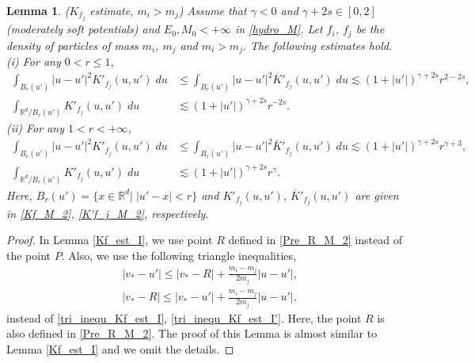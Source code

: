 \documentclass[reqno,10pt]{amsart}
\newtheorem{lemma}[theorem]{Lemma}
\numberwithin{equation}{section}
\begin{document}
\begin{lemma} ($K_{f_j}$ estimate, $m_i>m_j$) \label{Kf_j_estimate_M_2}
Assume that $\gamma<0$ and $\gamma+2s \in [0,2]$(moderately soft potentials) and $E_0,M_0<+\infty$ in \eqref{hydro_M}. Let $f_i$, $f_j$ be the density of particles of mass $m_i$, $m_j$ and $m_i>m_j.$ The following estimates hold.
\\
(i) For any $0<r \leq 1$,
\begin{align*} 
 \int_{B_{r}(u')}|u-u'|^2K'_{f_j}(u,u')\; du &\leq \int_{B_{r}(u')}|u-u'|^2\overline{K}'_{f_j}(u,u')\; du \lesssim (1+|u'|)^{\gamma+2s}r^{2-2s}, \\
 \int_{\mathbb{R}^d/B_{r}(u')}K'_{f_j}(u,u')\; du &\lesssim (1+|u'|)^{\gamma+2s}r^{-2s}.
\end{align*}
(ii) For any $1<r<+\infty$,
\begin{align*}  
    \int_{B_{r}(u')}|u-u'|^2K'_{f_j}(u,u')\; du &\leq \int_{B_{r}(u')}|u-u'|^2\overline{K}'_{f_j}(u,u')\; du \lesssim (1+|u'|)^{\gamma+2s}r^{\gamma+3},\\
    \int_{\mathbb{R}^d/B_{r}(u')}K'_{f_j}(u,u')\; du &\lesssim (1+|u'|)^{\gamma+2s}r^{\gamma}.
\end{align*}
Here,  $B_r(u') =\{x\in \mathbb{R}^d | \;|u'-x|<r \}$ and $K'_{f_j}(u,u')$, $\overline{K}'_{f_j}(u,u')$ are given in \eqref{Kf_M_2}, \eqref{K'f_j_M_2}, respectively. 
\end{lemma}
\begin{proof} 
In Lemma \ref{Kf_est_I}, we use point $R$ defined in  \eqref{Pre_R_M_2} instead of the point $P$. Also, we use the following triangle inequalities,
\begin{align} 
  &|v_*-u'| \leq |v_*-R|+\frac{m_i-m_j}{2m_j}|u-u'|,\label{Kf_inequal_M_2}\\
  &|v_*-R| \leq |v_*-u'|+\frac{m_i-m_j}{2m_j}|u-u'|, \label{Kf_inequal_M_2'}
\end{align} instead of \eqref{tri_inequ_Kf_est_I}, \eqref{tri_inequ_Kf_est_I'}. Here, the point $R$ is also defined in \eqref{Pre_R_M_2}. The proof of this Lemma is almost similar to Lemma \ref{Kf_est_I} and we omit the details.
\end{proof} \vspace{3mm}
\end{document}

